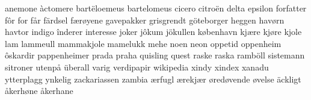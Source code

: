 \documentclass[norsk]{scrartcl}
\begin{document}
anemone
àctomere
bartëloemeus
bartelomeus
cicero
citroën
delta
epsilon
forfatter
fôr
for
får
färdsel
færøyene
gavepakker
grisgrendt
göteborger
heggen
havørn
havtor
indigo
înderer
interesse
joker
jôkum
jökullen
københavn
kjære
kjøre
kjole
lam
lammeull
mammakjole
mamelukk
mehe
noen
neon
oppetid
oppenheim
ôskardir
pappenheimer
prada
praha
quisling
quest
raske
raska
ramböll
sistemann
sitroner
utenpå
überall
varig
verdipapir
wikipedia
xindy
xindex
xanadu
ytterplagg
ynkelig
zackariassen
zambia
ærfugl
ærekjær
øredøvende
øvelse
äckligt
åkerhøne
åkerhane


\printindex
\end{document}

